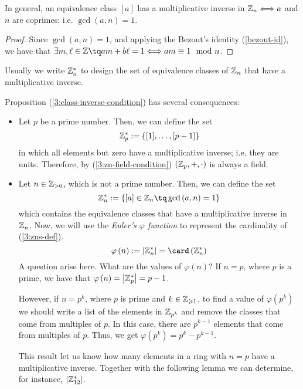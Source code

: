 \begin{prop} \label{3:class-inverse-condition}
    In general, an equivalence class $[a]$ has a multiplicative inverse in $\mathbb{Z}_n \Longleftrightarrow a$ and $n$ are coprimes; i.e. $\gcd\left( a, n \right) = 1$.
\end{prop}

\begin{proof}
    Since $\gcd\left( a, n \right) = 1$, and applying the Bezout's identity (\ref{bezout-id}), we have that
    $\exists m, \ell\in\Z\tq am + b\ell = 1\iff am\equiv 1\mod n$.
\end{proof}

\begin{notation}
    Usually we write $\mathbb{Z}^*_n$ to design the set of equivalence classes of $\mathbb{Z}_n$ that have a multiplicative
    inverse.
\end{notation}

\noindent Proposition (\ref{3:class-inverse-condition}) has several consequences:
\begin{itemize}
    \item Let $p$ be a prime number. Then, we can define the set
        \begin{equation}
            \mathbb{Z}^*_p := \{[1], \ldots, [p - 1]\}
        \end{equation}
        in which all elements but zero have a multiplicative inverse; i.e. they are units. Therefore, by
        (\ref{3:zn-field-condition}) $\left( \mathbb{Z}_p, +, \cdot \right) $ is always a field.
    \item Let $n\in\mathbb{Z}_{> 0}$, which is not a prime number. Then, we can define the set
        \begin{equation}\label{3:zns-def}
            \Z^*_n := \{[a]\in\Z_n\tq \gcd\left( a, n \right) = 1\}
        \end{equation}
        which contains the equivalence classes that have a multiplicative inverse in $\mathbb{Z}_n$. Now, we will
        use the \textit{Euler's $\varphi$ function} to represent the cardinality of (\ref{3:zns-def}).
        \begin{equation}
            \varphi\left( n \right) := \abs{\Z^*_n} = \card \left( \Z^*_n \right)
        \end{equation}
        A question arise here. What are the values of $\varphi\left( n \right) $? If $n = p$, where $p$ is
        a prime, we have that $\varphi\left( n \right) = \left\vert \mathbb{Z}^*_p \right\vert = p - 1$.

        However, if $n = p^k$, where $p$ is prime and $k\in\mathbb{Z}_{\geqslant 1}$, to find a value of $\varphi
        \left( p^k \right) $ we should write a list of the elements in $\mathbb{Z}_{p^k}$ and remove the classes
        that come from multiples of $p$. In this case, there are $p^{k-1}$ elements that come from multiples
        of $p$. Thus, we get $\varphi\left( p^k \right) = p^k - p^{k-1}$.

        This result let us know how many elements in a ring with $n = p$ have a multiplicative inverse.
        Together with the following lemma we can determine, for instance, $\left\vert \mathbb{Z}^*_{12} \right\vert$.
\end{itemize}

